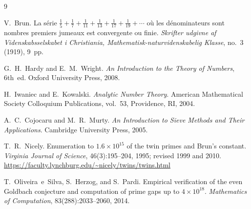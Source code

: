 \documentclass[12pt,a4paper]{amsart}
\theoremstyle{definition}
\begin{document}
\begin{thebibliography}{9}

V.~Brun.
\newblock La s{\'e}rie $\frac{1}{5}+\frac{1}{7}+\frac{1}{11}+\frac{1}{13}+\frac{1}{17}+\frac{1}{19}+\cdots$
  o\`u les d{\'e}nominateurs sont nombres premiers jumeaux est convergente ou finie.
\newblock \emph{Skrifter udgivne af Videnskabsselskabet i Christiania, Mathematisk-naturvidenskabelig Klasse},
  no.~3 (1919), 9~pp.

G.~H.~Hardy and E.~M.~Wright.
\newblock \emph{An Introduction to the Theory of Numbers}, 6th~ed.
\newblock Oxford University Press, 2008.

H.~Iwaniec and E.~Kowalski.
\newblock \emph{Analytic Number Theory}.
\newblock American Mathematical Society Colloquium Publications, vol.~53,
  Providence, RI, 2004.

A.~C.~Cojocaru and M.~R.~Murty.
\newblock \emph{An Introduction to Sieve Methods and Their Applications}.
\newblock Cambridge University Press, 2005.

T.~R.~Nicely.
\newblock Enumeration to $1.6 \times 10^{15}$ of the twin primes and Brun's constant.
\newblock \emph{Virginia Journal of Science}, 46(3):195--204, 1995; revised 1999 and 2010.
\newblock \url{https://faculty.lynchburg.edu/~nicely/twins/twins.html}

T.~Oliveira~e~Silva, S.~Herzog, and S.~Pardi.
\newblock Empirical verification of the even Goldbach conjecture and computation
  of prime gaps up to $4 \times 10^{18}$.
\newblock \emph{Mathematics of Computation}, 83(288):2033--2060, 2014.

\end{thebibliography}
\end{document}

